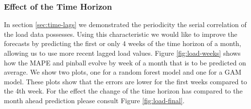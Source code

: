 \documentclass[conference]{IEEEtran}
\begin{document}
\subsubsection{Effect of the Time Horizon}
In section \ref{sec:time-lags} we demonstrated the periodicity the serial correlation of the load data possesses. Using this characteristic we would like to improve the forecasts by predicting the first or only 4 weeks of the time horizon of a month, allowing us to use more recent lagged load values. Figure \ref{fig:load-weeks} shows how the MAPE and pinball evolve by week of a month that is to be predicted on average. We show two plots, one for a random forest model and one for a GAM model. These plots show that the errors are lower for the first weeks compared to the 4th week. For the effect the change of the time horizon has compared to the month ahead prediction please consult Figure \ref{fig:load-final}. 
\end{document}
